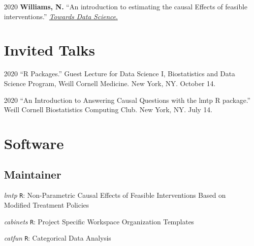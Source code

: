 \documentclass[12pt,letterpaper]{report}
\begin{document}
    \begin{tablist}
    
    	\item[2020] \tab \textbf{Williams, N.} \enquote{An introduction to estimating the causal Effects of feasible interventions.} \href{https://towardsdatascience.com/an-introduction-to-estimating-the-causal-effects-of-feasible-interventions-e07ed45136ff?source=friends_link&sk=811ae7c0e029cd850418678a6284a781}{\textit{Towards Data Science}.}
    
    \end{tablist}

    \section*{Invited Talks}

    \begin{tablist}
    
    	\item[2020] \tab \enquote{R Packages.} Guest Lecture for Data Science I, Biostatistics and Data Science Program, Weill Cornell Medicine. New York, NY. October 14.

        \item[2020] \tab \enquote{An Introduction to Answering Causal Questions with the lmtp R package.} Weill Cornell Biostatistics Computing Club. New York, NY. July 14.

    \end{tablist}
    
    \section*{Software}
    
    \subsection*{Maintainer}
    
    \begin{tablist}
    
    	\item[\textit{lmtp}] \tab \texttt{R}: Non-Parametric Causal Effects of Feasible Interventions Based on Modified Treatment Policies
	
	\item[\textit{cabinets}] \tab \texttt{R}: Project Specific Workspace Organization Templates
	
	\item[\textit{catfun}] \tab \texttt{R}: Categorical Data Analysis
    
    \end{tablist}
    
\end{document}
